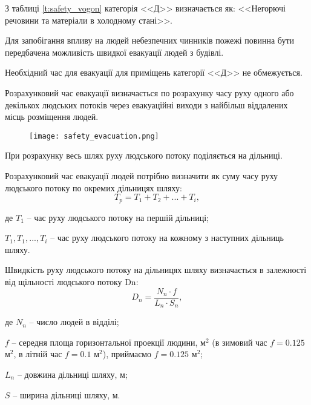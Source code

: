 \par З таблиці \ref{t:safety_vogon} категорія <<Д>> визначається як: <<Негорючі речовини та матеріали в холодному стані>>.

\par Для запобігання впливу на людей небезпечних чинників пожежі повинна бути передбачена можливість швидкої евакуації людей з будівлі.
\par Необхідний час для евакуації для приміщень категорії <<Д>> не обмежується.
\par Розрахунковий час евакуації визначається по розрахунку часу руху одного або декількох людських потоків через евакуаційні виходи з найбільш віддалених місць розміщення людей.

\begin{figure}[!ht]
\centering
		\texttt{[image: safety\_evacuation.png]}
		\vspace{18pt}
		\label{pic:safety_evacuation}
\end{figure}

\par При розрахунку весь шлях руху людського потоку поділяється на дільниці.
\par Розрахунковий час евакуації людей потрібно визначити як суму часу руху людського потоку по окремих дільницях шляху:
	\begin{equation}
		T_{p}=T_{1}+T_{2}+ ... + T_{i},
	\end{equation}
\par де $T_{1}$ -- час руху людського потоку на першій дільниці;
\par $T_{1}, T_{1}, ..., T_{i}$ -- час руху людського потоку на кожному з наступних дільниць шляху.

\par Швидкість руху людського потоку на дільницях шляху визначається в залежності від щільності людського потоку Dn:
	\begin{equation}
		D_{n}=\frac{N_{n}\cdot f}{L_{n}\cdot S_{n}},
	\end{equation}
\par де $N_{n}$ -- число людей в відділі;
\par $f$ -- середня площа горизонтальної проекції людини, м$^2$ (в зимовий час $f = 0.125$ м$^2$, в літній час $f = 0.1$ м$^2$), приймаємо $f = 0.125$ м$^2$;
\par $L_{n}$ -- довжина дільниці шляху, м;
\par $S$ -- ширина дільниці шляху, м.

